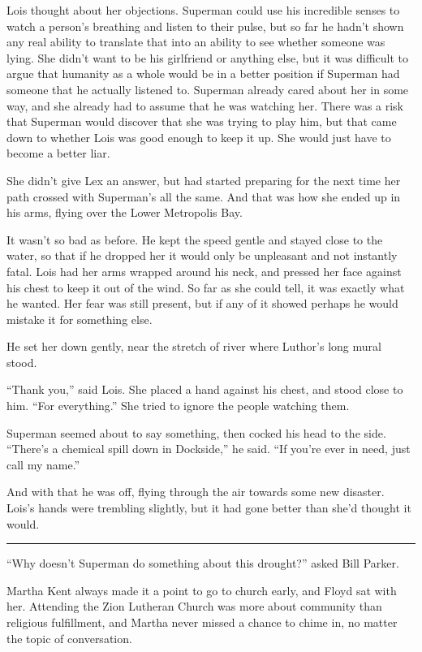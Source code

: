 \documentclass[ebook,12pt]{memoir}
\begin{document}
Lois thought about her objections. Superman could use his incredible
senses to watch a person's breathing and listen to their pulse, but so
far he hadn't shown any real ability to translate that into an ability
to see whether someone was lying. She didn't want to be his girlfriend
or anything else, but it was difficult to argue that humanity as a whole
would be in a better position if Superman had someone that he actually
listened to. Superman already cared about her in some way, and she
already had to assume that he was watching her. There was a risk that
Superman would discover that she was trying to play him, but that came
down to whether Lois was good enough to keep it up. She would just have
to become a better liar.

She didn't give Lex an answer, but had started preparing for the next
time her path crossed with Superman's all the same. And that was how she
ended up in his arms, flying over the Lower Metropolis Bay.

It wasn't so bad as before. He kept the speed gentle and stayed close to
the water, so that if he dropped her it would only be unpleasant and not
instantly fatal. Lois had her arms wrapped around his neck, and pressed
her face against his chest to keep it out of the wind. So far as she
could tell, it was exactly what he wanted. Her fear was still present,
but if any of it showed perhaps he would mistake it for something else.

He set her down gently, near the stretch of river where Luthor's long
mural stood.

``Thank you,'' said Lois. She placed a hand against his chest, and stood
close to him. ``For everything.'' She tried to ignore the people
watching them.

Superman seemed about to say something, then cocked his head to the
side. ``There's a chemical spill down in Dockside,'' he said. ``If
you're ever in need, just call my name.''

And with that he was off, flying through the air towards some new
disaster. Lois's hands were trembling slightly, but it had gone better
than she'd thought it would.

\begin{center}\rule{0.5\linewidth}{0.5pt}\end{center}

``Why doesn't Superman do something about this drought?'' asked Bill
Parker.

Martha Kent always made it a point to go to church early, and Floyd sat
with her. Attending the Zion Lutheran Church was more about community
than religious fulfillment, and Martha never missed a chance to chime
in, no matter the topic of conversation.
\end{document}
